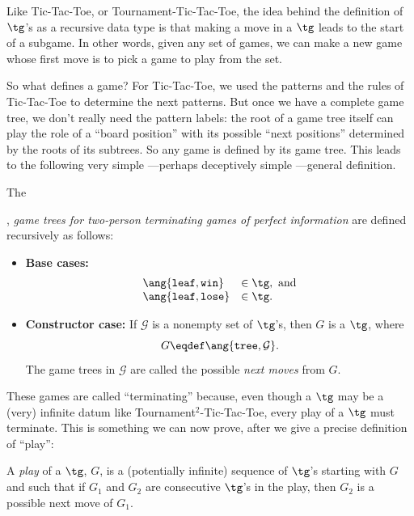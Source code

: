 \begin{definition}

Like Tic-Tac-Toe, or Tournament-Tic-Tac-Toe, the idea behind the
definition of $\tg$'s as a recursive data type is that making a move
in a $\tg$ leads to the start of a subgame.  In other words, given any
set of games, we can make a new game whose first move is to pick a
game to play from the set.

So what defines a game?  For Tic-Tac-Toe, we used the patterns and the
rules of Tic-Tac-Toe to determine the next patterns.  But once we have
a complete game tree, we don't really need the pattern labels: the
root of a game tree itself can play the role of a ``board position''
with its possible ``next positions'' determined by the roots of its
subtrees.  So any game is defined by its game tree.  This leads to the
following very simple ---perhaps deceptively simple ---general
definition.

\begin{definition}
The , \emph{game trees for two-person terminating
    games of perfect information} are defined recursively as follows:
\begin{itemize}

\item \textbf{Base cases:}
\[\begin{array}{ll}
\ang{\texttt{leaf},\texttt{win}} & \in \tg, \text{ and}\\
\ang{\texttt{leaf},\texttt{lose}}& \in \tg.
\end{array}\]

\item \textbf{Constructor case:}
If $\mathcal{G}$ is a nonempty set of
$\tg$'s, then $G$ is a $\tg$, where
\[
G \eqdef \ang{\texttt{tree},\mathcal{G}}.
\]
The game trees in $\mathcal{G}$ are called the possible \emph{next moves}
from $G$.
\end{itemize}

\end{definition}

These games are called ``terminating'' because, even though a $\tg$ may be
a (very) infinite datum like Tournament$^2$-Tic-Tac-Toe, every play of a
$\tg$ must terminate.  This is something we can now prove, after we give a
precise definition of ``play'':

\begin{definition}
A \emph{play} of a $\tg$, $G$, is a (potentially infinite) sequence of
$\tg$'s starting with $G$ and such that if $G_1$ and $G_2$ are consecutive
$\tg$'s in the play, then $G_2$ is a possible next move of $G_1$.


\end{definition}
\end{definition}
